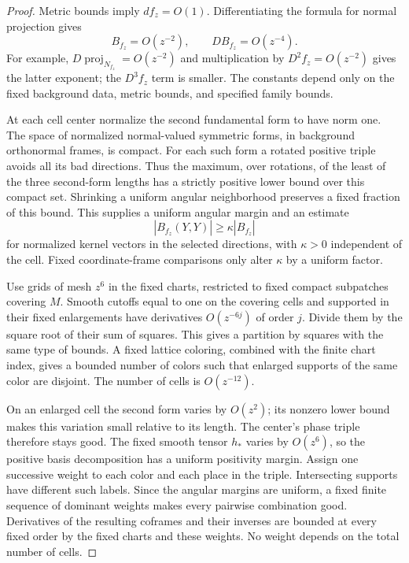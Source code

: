 \begin{proof}
Metric bounds imply $df_z=O(1)$. Differentiating the formula for normal
projection gives
\[
 B_{f_z}=O(z^{-2}),\qquad DB_{f_z}=O(z^{-4}).
\]
For example, $D\operatorname{proj}_{N_{f_z}}=O(z^{-2})$ and multiplication by
$D^2f_z=O(z^{-2})$ gives the latter exponent; the $D^3f_z$ term is smaller.
The constants depend only on the fixed background data, metric bounds, and
specified family bounds.

At each cell center normalize the second fundamental form to have norm one.
The space of normalized normal-valued symmetric forms, in background
orthonormal frames, is compact. For each such form a rotated positive triple
avoids all its bad directions. Thus the maximum, over rotations, of the least
of the three second-form lengths has a strictly positive lower bound over
this compact set. Shrinking a uniform angular neighborhood preserves a fixed
fraction of this bound. This supplies a uniform angular margin and an estimate
\[
 |B_{f_z}(Y,Y)|\ge\kappa |B_{f_z}|
\]
for normalized kernel vectors in the selected directions, with $\kappa>0$
independent of the cell. Fixed coordinate-frame comparisons only alter
$\kappa$ by a uniform factor.

Use grids of mesh $z^6$ in the fixed charts, restricted to fixed compact
subpatches covering $M$. Smooth cutoffs equal to one on the covering cells and
supported in their fixed enlargements have derivatives $O(z^{-6j})$ of order
$j$. Divide them by the square root of their sum of squares. This gives a
partition by squares with the same type of bounds. A fixed lattice coloring,
combined with the finite chart index, gives a bounded number of colors such
that enlarged supports of the same color are disjoint. The number of cells is
$O(z^{-12})$.

On an enlarged cell the second form varies by $O(z^2)$; its nonzero lower bound
makes this variation small relative to its length. The center's phase triple
therefore stays good. The fixed smooth tensor $h_*$ varies by $O(z^6)$, so the
positive basis decomposition has a uniform positivity margin. Assign one
successive weight to each color and each place in the triple. Intersecting
supports have different such labels. Since the angular margins are uniform,
a fixed finite sequence of dominant weights makes every pairwise combination
good. Derivatives of the resulting coframes and their inverses are bounded at
every fixed order by the fixed charts and these weights. No weight depends on
the total number of cells.


\end{proof}
